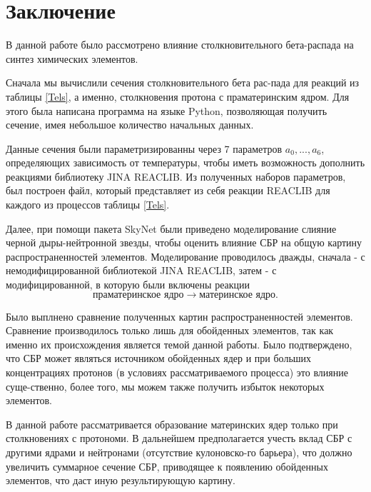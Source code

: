 \documentclass[14pt, a4paper]{article}
\begin{document}
\section*{\centering Заключение}
В данной работе было рассмотрено влияние столкновительного бета-распада на синтез химических элементов.

Сначала мы вычислили сечения столкновительного бета рас-пада для реакций из таблицы \ref{Tels}, а именно, столкновения протона с праматеринским ядром. Для этого была написана программа на языке Python, позволяющая получить сечение, имея небольшое количество начальных данных.

Данные сечения были параметризированны через 7 параметров $a_0, ..., a_6$, определяющих зависимость от температуры, чтобы иметь возможность дополнить реакциями библиотеку JINA REACLIB. Из полученных наборов параметров, был построен файл, который представляет из себя реакции REACLIB для каждого из процессов таблицы \ref{Tels}.


Далее, при помощи пакета SkyNet были приведено моделирование слияние черной дыры-нейтронной звезды, чтобы оценить влияние СБР на общую картину распространенностей элементов. Моделирование проводилось дважды, сначала - с немодифицированной библиотекой JINA REACLIB, затем - с модифицированной, в которую были включены реакции $$\text{праматеринское ядро} \to \text{материнское ядро}.$$

Было выплнено сравнение полученных картин распространенностей элементов.  Сравнение производилось только лишь для обойденных элементов, так как именно их происхождения является темой данной работы. Было подтверждено, что СБР может являться источником обойденных ядер и при больших концентрациях протонов (в условиях рассматриваемого процесса) это влияние суще-ственно, более того, мы можем также получить избыток некоторых элементов.

В данной работе рассматривается образование материнских ядер только при столкновениях с протономи. В дальнейшем предполагается учесть вклад СБР с другими ядрами и нейтронами (отсутствие кулоновско-го барьера), что должно увеличить суммарное сечение СБР, приводящее к появлению обойденных элементов, что даст иную результирующую картину.

\newpage
{}


\end{document}
